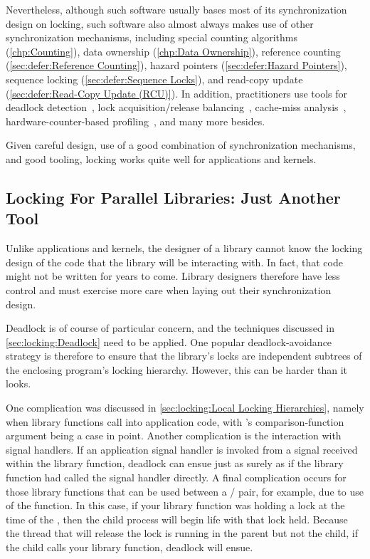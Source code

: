 Nevertheless, although such software usually bases most of its
synchronization design on locking, such software also almost always
makes use of other synchronization mechanisms, including
special counting algorithms (\cref{chp:Counting}),
data ownership (\cref{chp:Data Ownership}),
reference counting (\cref{sec:defer:Reference Counting}),
hazard pointers (\cref{sec:defer:Hazard Pointers}),
sequence locking (\cref{sec:defer:Sequence Locks}), and
read-copy update (\cref{sec:defer:Read-Copy Update (RCU)}).
In addition, practitioners use tools for deadlock
detection~\cite{JonathanCorbet2006lockdep},
lock acquisition/release balancing~\cite{JonathanCorbet2004sparse},
cache-miss analysis~\cite{ValgrindHomePage},
hardware-counter-based profiling~\cite{LinuxKernelPerfWiki,OProfileHomePage},
and many more besides.

Given careful design, use of a good combination of synchronization
mechanisms, and good tooling, locking works quite well for applications
and kernels.

\subsection{Locking For Parallel Libraries:
					    Just Another Tool}
\label{sec:locking:Locking For Parallel Libraries: Just Another Tool}

Unlike applications and kernels, the designer of a library cannot
know the locking design of the code that the library will be interacting
with.
In fact, that code might not be written for years to come.
Library designers therefore have less control and must exercise more
care when laying out their synchronization design.

Deadlock is of course of particular concern, and the techniques discussed
in \cref{sec:locking:Deadlock} need to be applied.
One popular deadlock-avoidance strategy is therefore to ensure that
the library's locks are independent subtrees of the enclosing program's
locking hierarchy.
However, this can be harder than it looks.

One complication was discussed in
\cref{sec:locking:Local Locking Hierarchies}, namely
when library functions call into application code, with 's
comparison-function argument being a case in point.
Another complication is the interaction with signal handlers.
If an application signal handler is invoked from a signal received within
the library function, deadlock can ensue just as surely as
if the library function had called the signal handler directly.
A final complication occurs for those library functions that can be used
between a / pair, for example, due to use of
the  function.
In this case, if your library function was holding a lock at the time of
the , then the child process will begin life with that lock held.
Because the thread that will release the lock is running in the parent
but not the child, if the child calls your library function, deadlock
will ensue.


